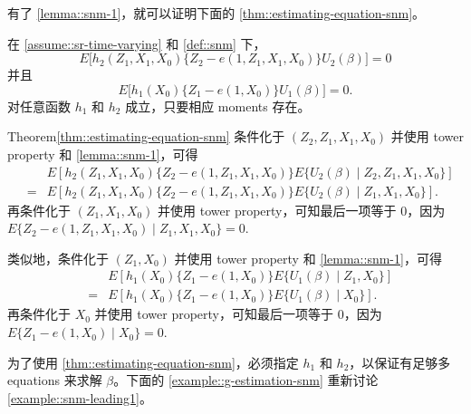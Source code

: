 有了 \cref{lemma::snm-1}，就可以证明下面的 \cref{thm::estimating-equation-snm}。

\begin{theorem}
\label{thm::estimating-equation-snm}
在 \cref{assume::sr-time-varying} 和 \cref{def::snm} 下，
$$
E\Big[  h_2(Z_1, X_1, X_0)  \{ Z_2 - e(1, Z_1, X_1, X_0)  \}  U_2(\beta)   \Big] = 0
$$
并且
$$
E\Big[    h_1(X_0)  \{  Z_1 - e(1, X_0) \}  U_1(\beta) \Big] = 0 . 
$$
对任意函数 $h_1$ 和 $h_2$ 成立，只要相应 moments 存在。
\end{theorem}

 

\begin{myproof}{Theorem}{\cref{thm::estimating-equation-snm}}
条件化于 $(Z_2, Z_1, X_1, X_0)$ 并使用 tower property 和 \cref{lemma::snm-1}，可得
\begin{eqnarray*}
&& E\left[  h_2(Z_1, X_1, X_0)  \{  Z_2 - e(1, Z_1, X_1, X_0)  \}   E\{U_2(\beta) \mid  Z_2, Z_1, X_1, X_0\}   \right] \\
&=& E\left[  h_2(Z_1, X_1, X_0)  \{  Z_2 - e(1, Z_1, X_1, X_0)  \}   E\{U_2(\beta) \mid  Z_1, X_1, X_0\}   \right] .
\end{eqnarray*}
再条件化于 $( Z_1, X_1, X_0)$ 并使用 tower property，可知最后一项等于 0，因为 $E\{  Z_2 - e(1, Z_1, X_1, X_0) \mid  Z_1, X_1, X_0\} = 0. $
 
类似地，条件化于 $(Z_1, X_0)$ 并使用 tower property 和 \cref{lemma::snm-1}，可得
 \begin{eqnarray*}
&& E\left[    h_1(X_0)   \{  Z_1 - e(1, X_0) \}  E \{U_1(  \beta) \mid Z_1, X_0\}  \right]  \\
&=& E\left[    h_1(X_0)   \{  Z_1 - e(1, X_0) \} E \{U_1(  \beta) \mid X_0\}  \right] .
 \end{eqnarray*}
再条件化于 $X_0$ 并使用 tower property，可知最后一项等于 0，因为 $E\{  Z_1 - e(1, X_0) \mid X_0 \} = 0.$
\end{myproof}



为了使用 \cref{thm::estimating-equation-snm}，必须指定 $h_1$ 和 $h_2$，以保证有足够多 equations 来求解 $\beta$。下面的 \cref{example::g-estimation-snm} 重新讨论 \cref{example::snm-leading1}。



